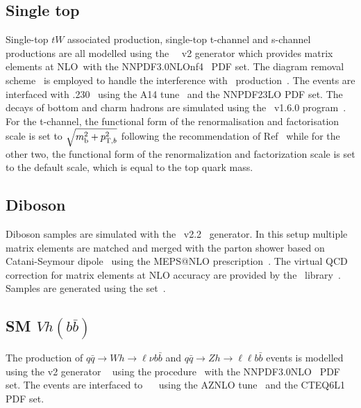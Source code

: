 \subsection{Single top}

\par Single-top $tW$ associated production, single-top t-channel and s-channel productions are all modelled using the \powhegbox~\cite{Frederix:2012dh,Nason:2004rx,Frixione:2007vw,Alioli:2010xd}~v2
generator which provides matrix elements at NLO\
with the NNPDF3.0NLOnf4~\cite{Ball:2014uwa} PDF set.
The diagram removal scheme~\cite{Frixione:2008yi} is employed to handle the interference with \ttbar\ production~\cite{ATL-PHYS-PUB-2016-020}.
The events are interfaced with \pythia.230~\cite{Sjostrand:2014zea} using the A14 tune~\cite{ATL-PHYS-PUB-2014-021} and the NNPDF23LO PDF set.
The decays of bottom and charm hadrons are simulated using the \evtgen\ v1.6.0 program~\cite{EvtGen}.
For the t-channel, the functional form of the renormalisation and factorisation scale is set to $\sqrt{m_{\textrm{b}}^2 + p_{{\textrm T},b}^2}$
following the recommendation of Ref~\cite{Frederix:2012dh} while for the other two, the functional form of the renormalization and factorization scale is set to the default scale, which is equal to the top quark mass.

\subsection{Diboson}

\par Diboson samples are simulated with the \sherpa~v2.2~\cite{Bothmann:2019yzt} generator. 
In this setup multiple matrix elements are matched and merged with the \sherpa parton shower based on Catani-Seymour dipole~\cite{Gleisberg:2008fv,Schumann:2007mg} using the MEPS@NLO prescription~\cite{Hoeche:2011fd,Hoeche:2012yf,Catani:2001cc,Hoeche:2009rj}. 
The virtual QCD correction for matrix elements at NLO accuracy are provided by the \openloops\ library~\cite{Cascioli:2011va,Denner:2016kdg}. 
Samples are generated using the \nnpdfnnlo set~\cite{Ball:2014uwa}.

\subsection{SM $Vh(b\bar{b})$}

\par The production of $q\bar{q}\to Wh\to \ell\nu b\bar{b}$ and $q\bar{q}\to Zh\to \ell\ell b\bar{b}$ events is modelled using the \powhegbox v2 generator
~\cite{Alioli:2010xd} using the \minlo procedure~\cite{Hamilton:2012np,Luisoni:2013kna} with the NNPDF3.0NLO~\cite{Ball:2014uwa} PDF set.
The events are interfaced to \pythia~\cite{Sjostrand:2014zea}~ using the AZNLO tune~\cite{Aad:2014xaa} and the CTEQ6L1~\cite{Pumplin:2002vw} PDF set.

